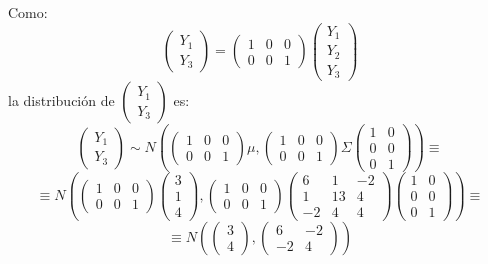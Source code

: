 \documentclass[11pt,a4paper]{article}
\begin{document}
\begin{enumerate}[label=\arabic*.]
\begin{enumerate}[label=\arabic*)]
Como:
$$\begin{pmatrix} Y_{1} \\ Y_{3} \end{pmatrix} = \begin{pmatrix}
1 & 0 & 0 \\
0 & 0 & 1
\end{pmatrix} \begin{pmatrix} Y_{1} \\ Y_{2} \\ Y_{3} \end{pmatrix}$$
la distribución de $\begin{pmatrix} Y_{1} \\ Y_{3} \end{pmatrix}$ es:
$$\begin{pmatrix} Y_{1} \\ Y_{3} \end{pmatrix} \sim N(\begin{pmatrix}
1 & 0 & 0 \\
0 & 0 & 1
\end{pmatrix} \mu, \begin{pmatrix}
1 & 0 & 0 \\
0 & 0 & 1
\end{pmatrix} \Sigma \begin{pmatrix}
1 & 0 \\
0 & 0 \\
0 & 1
\end{pmatrix}) \equiv$$
$$\equiv N(\begin{pmatrix}
1 & 0 & 0 \\
0 & 0 & 1
\end{pmatrix} \begin{pmatrix} 3 \\ 1 \\ 4 \end{pmatrix}, \begin{pmatrix}
1 & 0 & 0 \\
0 & 0 & 1
\end{pmatrix} \begin{pmatrix}
6 & 1 & -2 \\
1 & 13 & 4 \\
-2 & 4 & 4
\end{pmatrix} \begin{pmatrix}
1 & 0 \\
0 & 0 \\
0 & 1
\end{pmatrix}) \equiv$$
$$\equiv N(\begin{pmatrix} 3 \\ 4 \end{pmatrix}, \begin{pmatrix}
6 & -2 \\
-2 & 4
\end{pmatrix})$$


\end{enumerate}
\end{enumerate}
\end{document}
